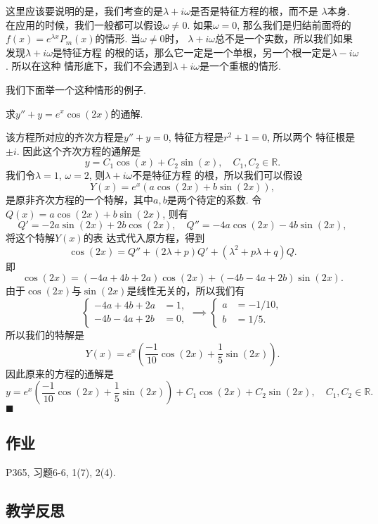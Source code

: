 \documentclass[a4paper, titlepage, twoside]{article}
\newenvironment{jie}{\noindent{\bf 解:}}{\hfill$\blacksquare$\par}
\numberwithin{equation}{section}
\begin{document}
这里应该要说明的是，我们考查的是$\lambda +i \omega$是否是特征方程的根，而不是
$\lambda$本身. 在应用的时候，我们一般都可以假设$\omega\neq 0$. 如果$\omega=0$, 
那么我们是归结前面将的$f(x)=e^{\lambda x} P_m(x)$的情形. 当$\omega\neq 0$时，
$\lambda +i\omega$总不是一个实数，所以我们如果发现$\lambda +
i\omega$是特征方程
的根的话，那么它一定是一个单根，另一个根一定是$\lambda -i\omega$. 所以在这种
情形底下，我们不会遇到$\lambda + i\omega$是一个重根的情形. 

我们下面举一个这种情形的例子. 

\begin{example}[P363, 例3]
	求$y'' + y = e^{x} \cos(2x)$的通解. 
\end{example}
\begin{jie}
	该方程所对应的齐次方程是$y'' +y=0$, 特征方程是$r^2 +1=0$, 所以两个
	特征根是$\pm i$. 因此这个齐次方程的通解是
	$$ y = C_1 \cos(x) + C_2\sin(x), \quad C_1, C_2 \in \mathbb{R}.$$
	我们令$\lambda =1$, $\omega =2$, 则$\lambda + i\omega$不是特征方程
	的根，所以我们可以假设
	$$ Y(x) = e^{x}(a\cos(2x) + b\sin(2x)), $$
	是原非齐次方程的一个特解，其中$a,
	b$是两个待定的系数. 令$Q(x)=a\cos(2x)+b\sin(2x)$, 则有
	$$ Q'=-2a\sin(2x) +2b\cos(2x), \quad Q''=-4a\cos(2x) -4b\sin(2x), $$
	将这个特解$Y(x)$的表
	达式代入原方程，得到
	$$ \cos(2x) = Q'' + (2\lambda +p) Q' + (\lambda^2 + p\lambda +q) Q.$$
	即
	$$
	\cos(2x) = (-4a+4b+2a)\cos(2x) + (-4b-4a+2b)\sin(2x).$$
	由于$\cos(2x)$与$\sin(2x)$是线性无关的，所以我们有
	$$
	\begin{cases}
		-4a+4b+2a&=1, \\
		-4b-4a+2b&=0,
	\end{cases}
	\implies 
	\begin{cases}
		a&=-1/10, \\
		b&=1/5.
	\end{cases}
	$$
	所以我们的特解是
	$$Y(x) = e^x\left(\frac{-1}{10}\cos(2x) +
	\frac{1}{5}\sin(2x)\right).$$
	因此原来的方程的通解是
	$$ y=e^x\left(\frac{-1}{10}\cos(2x) +
	\frac{1}{5}\sin(2x)\right) + C_1 \cos(2x) + C_2 \sin(2x), \quad 
	C_1, C_2\in \mathbb{R}.$$
\end{jie}

\subsection{作业}
P365, 习题6-6, 1(7), 2(4).
\subsection{教学反思}
\end{document}
